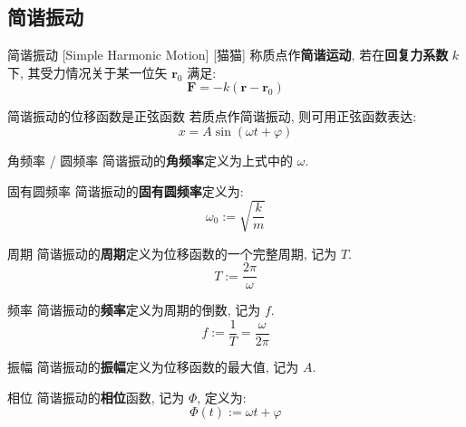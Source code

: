 \documentclass[UTF8]{ctexart}
\begin{document}
        \subsection{简谐振动}
            
            \begin{dfn}
                []
                {简谐振动}
                [Simple Harmonic Motion]
                [猫猫]
                称质点作\textbf{简谐运动}, 若在\textbf{回复力系数} \(k\) 下, 其受力情况关于某一位矢 \(\bm{r}_0\) 满足: 
                \[\bm{F}=-k(\bm{r}-\bm{r}_0)\]
            \end{dfn}
            
            \begin{thm}
                {简谐振动的位移函数是正弦函数}
                若质点作简谐振动, 则可用正弦函数表达: 
                \[x=A\sin(\omega t+\varphi)\]
            \end{thm}
            
            \begin{dfn}
                {角频率 / 圆频率}
                简谐振动的\textbf{角频率}定义为上式中的 \(\omega\). 
            \end{dfn}
            
            \begin{dfn}
                {固有圆频率}
                简谐振动的\textbf{固有圆频率}定义为: 
                \[\omega_0:=\sqrt{\frac{k}{m}}\]
            \end{dfn}
            
            \begin{dfn}
                {周期}
                简谐振动的\textbf{周期}定义为位移函数的一个完整周期, 记为 \(T\). 
                \[T:=\frac{2\pi}{\omega}\]
            \end{dfn}
            
            \begin{dfn}
                {频率}
                简谐振动的\textbf{频率}定义为周期的倒数, 记为 \(f\). 
                \[f:=\frac{1}{T}=\frac{\omega}{2\pi}\]
            \end{dfn}
            
            \begin{dfn}
                {振幅}
                简谐振动的\textbf{振幅}定义为位移函数的最大值, 记为 \(A\). 
            \end{dfn}
            
            \begin{dfn}
                {相位}
                简谐振动的\textbf{相位}函数, 记为 \(\Phi\), 定义为: 
                \[\Phi(t):=\omega t+\varphi\]
            \end{dfn}
            
\end{document}
